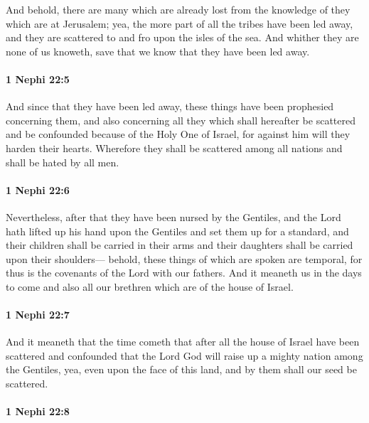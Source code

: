 			And behold, there are many which are already lost
			from the knowledge of they which are at Jerusalem;
			yea, the more part of all the tribes have been led away,
			and they are scattered to and fro upon the isles of the sea.
			And whither they are none of us knoweth,
			save that we know that they have been led away.

		\paragraph{1 Nephi 22:5} %
			\label{1 Nephi-22-5}

			And since that they have been led away,
			these things have been prophesied concerning them,
			and also concerning all they
			which shall hereafter be scattered and be confounded
			because of the Holy One of Israel,
			for against him will they harden their hearts.
			Wherefore they shall be scattered among all nations
			and shall be hated by all men.

		\paragraph{1 Nephi 22:6} %
			\label{1 Nephi-22-6}

			Nevertheless, after that they have been nursed by the Gentiles,
			and the Lord hath lifted up his hand upon the Gentiles
			and set them up for a standard,
			and their children shall be carried in their arms
			and their daughters shall be carried upon their shoulders—
			behold, these things of which are spoken are temporal,
			for thus is the covenants of the Lord with our fathers.
			And it meaneth us in the days to come
			and also all our brethren which are of the house of Israel.

		\paragraph{1 Nephi 22:7} %
			\label{1 Nephi-22-7}

			And it meaneth that the time cometh that
			after all the house of Israel have been scattered and confounded
			that the Lord God will raise up a mighty nation among the Gentiles,
			yea, even upon the face of this land,
			and by them shall our seed be scattered.

		\paragraph{1 Nephi 22:8} %
			\label{1 Nephi-22-8}

